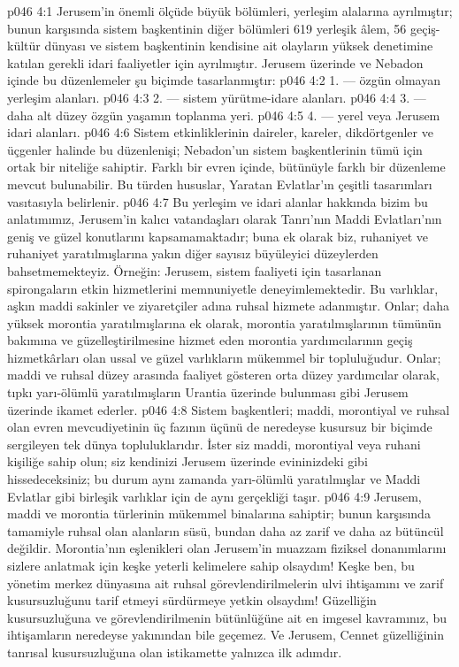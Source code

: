 \vs p046 4:1 Jerusem’in önemli ölçüde büyük bölümleri, yerleşim alalarına ayrılmıştır; bunun karşısında sistem başkentinin diğer bölümleri 619 yerleşik âlem, 56 geçiş\hyp{}kültür dünyası ve sistem başkentinin kendisine ait olayların yüksek denetimine katılan gerekli idari faaliyetler için ayrılmıştır. Jerusem üzerinde ve Nebadon içinde bu düzenlemeler şu biçimde tasarlanmıştır:
\vs p046 4:2 1. --- özgün olmayan yerleşim alanları.
\vs p046 4:3 2.\bibnobreakspace {} --- sistem yürütme\hyp{}idare alanları.
\vs p046 4:4 3.\bibnobreakspace {} --- daha alt düzey özgün yaşamın toplanma yeri.
\vs p046 4:5 4.\bibnobreakspace {} --- yerel veya Jerusem idari alanları.
\vs p046 4:6 Sistem etkinliklerinin daireler, kareler, dikdörtgenler ve üçgenler halinde bu düzenlenişi; Nebadon’un sistem başkentlerinin tümü için ortak bir niteliğe sahiptir. Farklı bir evren içinde, bütünüyle farklı bir düzenleme mevcut bulunabilir. Bu türden hususlar, Yaratan Evlatlar’ın çeşitli tasarımları vasıtasıyla belirlenir.
\vs p046 4:7 Bu yerleşim ve idari alanlar hakkında bizim bu anlatımımız, Jerusem’in kalıcı vatandaşları olarak Tanrı’nın Maddi Evlatları’nın geniş ve güzel konutlarını kapsamamaktadır; buna ek olarak biz, ruhaniyet ve ruhaniyet yaratılmışlarına yakın diğer sayısız büyüleyici düzeylerden bahsetmemekteyiz. Örneğin: Jerusem, sistem faaliyeti için tasarlanan spirongaların etkin hizmetlerini memnuniyetle deneyimlemektedir. Bu varlıklar, aşkın maddi sakinler ve ziyaretçiler adına ruhsal hizmete adanmıştır. Onlar; daha yüksek morontia yaratılmışlarına ek olarak, morontia yaratılmışlarının tümünün bakımına ve güzelleştirilmesine hizmet eden morontia yardımcılarının geçiş hizmetkârları olan ussal ve güzel varlıkların mükemmel bir topluluğudur. Onlar; maddi ve ruhsal düzey arasında faaliyet gösteren orta düzey yardımcılar olarak, tıpkı yarı\hyp{}ölümlü yaratılmışların Urantia üzerinde bulunması gibi Jerusem üzerinde ikamet ederler.
\vs p046 4:8 Sistem başkentleri; maddi, morontiyal ve ruhsal olan evren mevcudiyetinin üç fazının üçünü de neredeyse kusursuz bir biçimde sergileyen tek dünya topluluklarıdır. İster siz maddi, morontiyal veya ruhani kişiliğe sahip olun; siz kendinizi Jerusem üzerinde evininizdeki gibi hissedeceksiniz; bu durum aynı zamanda yarı\hyp{}ölümlü yaratılmışlar ve Maddi Evlatlar gibi birleşik varlıklar için de aynı gerçekliği taşır.
\vs p046 4:9 Jerusem, maddi ve morontia türlerinin mükemmel binalarına sahiptir; bunun karşısında tamamiyle ruhsal olan alanların süsü, bundan daha az zarif ve daha az bütüncül değildir. Morontia’nın eşlenikleri olan Jerusem’in muazzam fiziksel donanımlarını sizlere anlatmak için keşke yeterli kelimelere sahip olsaydım! Keşke ben, bu yönetim merkez dünyasına ait ruhsal görevlendirilmelerin ulvi ihtişamını ve zarif kusursuzluğunu tarif etmeyi sürdürmeye yetkin olsaydım! Güzelliğin kusursuzluğuna ve görevlendirilmenin bütünlüğüne ait en imgesel kavramınız, bu ihtişamların neredeyse yakınından bile geçemez. Ve Jerusem, Cennet güzelliğinin tanrısal kusursuzluğuna olan istikamette yalnızca ilk adımdır.
